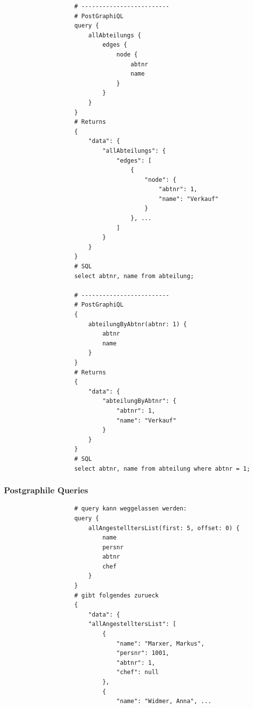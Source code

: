 \documentclass[a4paper, landscape, 8pt]{scrartcl}
\begin{document}
\begin{multicols*}{4}
\begin{lstlisting}
                    # -------------------------
                    # PostGraphiQL
                    query {
                        allAbteilungs {
                            edges {
                                node {
                                    abtnr
                                    name
                                }
                            }
                        }
                    }
                    # Returns
                    {
                        "data": {
                            "allAbteilungs": {
                                "edges": [
                                    {
                                        "node": {
                                            "abtnr": 1,
                                            "name": "Verkauf"
                                        }
                                    }, ...
                                ]
                            }
                        }
                    }
                    # SQL
                    select abtnr, name from abteilung;

                    # -------------------------
                    # PostGraphiQL
                    {
                        abteilungByAbtnr(abtnr: 1) {
                            abtnr
                            name
                        }
                    }
                    # Returns
                    {
                        "data": {
                            "abteilungByAbtnr": {
                                "abtnr": 1,
                                "name": "Verkauf"
                            }
                        }
                    }
                    # SQL
                    select abtnr, name from abteilung where abtnr = 1;
        \end{lstlisting}

        \subsubsection{Postgraphile Queries}
        \begin{lstlisting}
                    # query kann weggelassen werden:
                    query {
                        allAngestelltersList(first: 5, offset: 0) {
                            name
                            persnr
                            abtnr
                            chef
                        }
                    }
                    # gibt folgendes zurueck
                    {
                        "data": {
                        "allAngestelltersList": [
                            {
                                "name": "Marxer, Markus",
                                "persnr": 1001,
                                "abtnr": 1,
                                "chef": null
                            },
                            {
                                "name": "Widmer, Anna", ...
        \end{lstlisting}


\end{multicols*}
\end{document}

